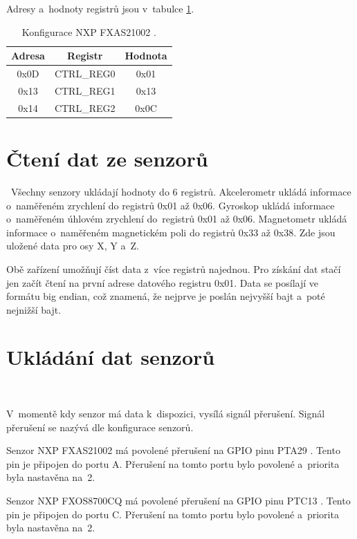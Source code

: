 Adresy a~hodnoty registrů jsou v~tabulce \ref{tab:FXAS21002}.

\begin{table}[!h]
    \centering
    \begin{tabular}{ccc}
        \hline
        \textbf{Adresa} & \textbf{Registr} & \textbf{Hodnota} \\
        \hline
        0x0D            & CTRL\_REG0       & 0x01             \\
        0x13            & CTRL\_REG1       & 0x13             \\
        0x14            & CTRL\_REG2       & 0x0C             \\
        \hline
    \end{tabular}
    \caption{Konfigurace NXP FXAS21002 \cite{FXAS21002}.}
    \label{tab:FXAS21002}
\end{table}

\section{Čtení dat ze senzorů}\
Všechny senzory ukládají hodnoty do 6 registrů. Akcelerometr ukládá informace
o~naměřeném zrychlení do registrů 0x01 až 0x06. Gyroskop ukládá informace 
o~naměřeném úhlovém zrychlení do~registrů 0x01 až 0x06. Magnetometr ukládá 
informace o~naměřeném magnetickém poli do registrů 0x33 až 0x38. Zde jsou 
uložené data pro osy X, Y a~Z.

Obě zařízení umožňují číst data z~více registrů najednou. Pro získání dat stačí jen
začít čtení na první adrese datového registru 0x01. Data se posílají ve formátu big
endian, což znamená, že nejprve je poslán nejvyšší bajt a~poté nejnižší bajt.

\section{Ukládání dat senzorů}\

V~momentě kdy senzor má data k~dispozici, vysílá signál přerušení. 
Signál přerušení se nazývá \uv{Data Ready} dle konfigurace senzorů. 

Senzor NXP FXAS21002 má povolené přerušení na GPIO pinu PTA29 
\cite{frdmk66UserGuide}. Tento pin je připojen do portu A. Přerušení na tomto portu bylo povolené a~priorita byla nastavěna na~2.

Senzor NXP FXOS8700CQ má povolené přerušení na GPIO pinu PTC13 
\cite{frdmk66UserGuide}. Tento pin je připojen do portu C. Přerušení na tomto portu bylo povolené a~priorita byla nastavěna na~2.

